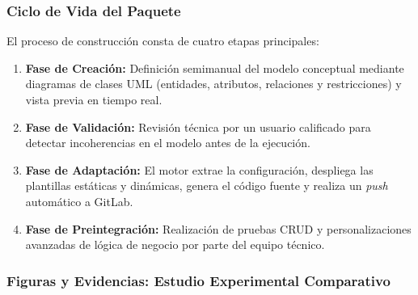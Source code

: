 \subsubsection{Ciclo de Vida del Paquete}
El proceso de construcción consta de cuatro etapas principales: %
\begin{enumerate}
    \item \textbf{Fase de Creación:} Definición semimanual del modelo conceptual mediante diagramas de clases UML (entidades, atributos, relaciones y restricciones) y vista previa en tiempo real. %
    \item \textbf{Fase de Validación:} Revisión técnica por un usuario calificado para detectar incoherencias en el modelo antes de la ejecución. %
    \item \textbf{Fase de Adaptación:} El motor extrae la configuración, despliega las plantillas estáticas y dinámicas, genera el código fuente y realiza un \textit{push} automático a GitLab. %
    \item \textbf{Fase de Preintegración:} Realización de pruebas CRUD y personalizaciones avanzadas de lógica de negocio por parte del equipo técnico. %
\end{enumerate}

\subsubsection{Figuras y Evidencias: Estudio Experimental Comparativo}

